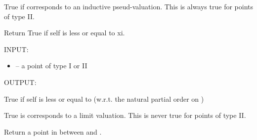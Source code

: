 \documentclass[letterpaper,10pt,english]{sphinxmanual}
\begin{document}
\begin{fulllineitems}
\begin{fulllineitems}
\end{fulllineitems}


\begin{fulllineitems}
\label{berkovich_line:mclf.berkovich.berkovich_line.TypeIIPointOnBerkovichLine.is_inductive}
True if  corresponds to an inductive pseud-valuation.
This is always true for points of type II.

\end{fulllineitems}


\begin{fulllineitems}
\label{berkovich_line:mclf.berkovich.berkovich_line.TypeIIPointOnBerkovichLine.is_leq}
Return True if self is less or equal to xi.

INPUT:
\begin{itemize}
\item {} 
 -- a point of type I or II

\end{itemize}

OUTPUT:

True if self is less or equal to  (w.r.t. the natural
partial order on )

\end{fulllineitems}


\begin{fulllineitems}
\label{berkovich_line:mclf.berkovich.berkovich_line.TypeIIPointOnBerkovichLine.is_limit_point}
True is  corresponds to a limit valuation.
This is never true for points of type II.

\end{fulllineitems}


\begin{fulllineitems}
\label{berkovich_line:mclf.berkovich.berkovich_line.TypeIIPointOnBerkovichLine.point_in_between}
Return a point in between  and .


\end{fulllineitems}
\end{fulllineitems}
\end{document}
